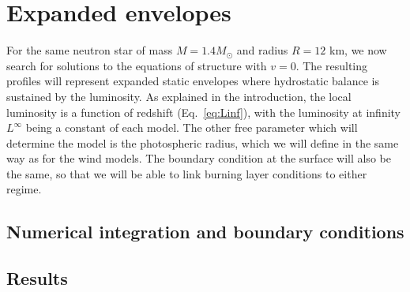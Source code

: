 \documentclass[../main.tex]{subfiles}
\begin{document}
\section{Expanded envelopes}



For the same neutron star of mass $M=1.4 M_\odot$ and radius $R=12$ km, we now search for solutions to the equations of structure with $v=0$. The resulting profiles will represent expanded static envelopes where hydrostatic balance is sustained by the luminosity. As explained in the introduction, the local luminosity is a function of redshift (Eq.~\ref{eq:Linf}), with the luminosity at infinity $L
^\infty$ being a constant of each model.  The other free parameter which will determine the model is the photospheric radius, which we will define in the same way as for the wind models. The boundary condition at the surface will also be the same, so that we will be able to link burning layer conditions to either regime.

\subsection{Numerical integration  and boundary conditions}

\subsection{Results}

\biblio
\end{document}
